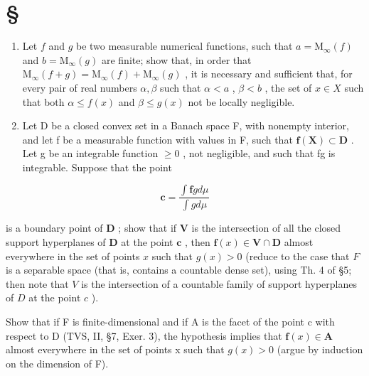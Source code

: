 \section*{\texorpdfstring{\S\CurrentExerciseGroup}{Section \CurrentExerciseGroup}}
{}

\begin{enumerate}
\def\labelenumi{\arabic{enumi})}
\item
  Let \(f\) and \(g\) be two measurable numerical functions, such that \(a = \mathrm{M}_{\infty}(f)\) and \(b = \mathrm{M}_{\infty}(g)\) are finite; show that, in order that \(\mathrm{M}_{\infty}(f + g) = \mathrm{M}_{\infty}(f) + \mathrm{M}_{\infty}(g)\) , it is necessary and sufficient that, for every pair of real numbers \(\alpha, \beta\) such that \(\alpha < a\) , \(\beta < b\) , the set of \(x \in X\) such that both \(\alpha \leqslant f(x)\) and \(\beta \leqslant g(x)\) not be locally negligible.
\item
  Let D be a closed convex set in a Banach space F, with nonempty interior, and let f be a measurable function with values in F, such that \(\mathbf{f}(\mathbf{X}) \subset \mathbf{D}\) . Let g be an integrable function \(\geqslant 0\) , not negligible, and such that fg is integrable. Suppose that the point
\end{enumerate}

\[
\mathbf {c} = \frac {\int \mathbf {f} g d \mu}{\int g d \mu}
\]

is a boundary point of \(\mathbf{D}\) ; show that if \(\mathbf{V}\) is the intersection of all the closed support hyperplanes of \(\mathbf{D}\) at the point \(\mathbf{c}\) , then \(\mathbf{f}(x) \in \mathbf{V} \cap \mathbf{D}\) almost everywhere in the set of points \(x\) such that \(g(x) > 0\) (reduce to the case that \(F\) is a separable space (that is, contains a countable dense set), using Th. 4 of §5; then note that \(V\) is the intersection of a countable family of support hyperplanes of \(D\) at the point \(c\) ).

Show that if F is finite-dimensional and if A is the facet of the point c with respect to D (TVS, II, §7, Exer. 3), the hypothesis implies that \(\mathbf{f}(x) \in \mathbf{A}\) almost everywhere in the set of points x such that \(g(x) > 0\) (argue by induction on the dimension of F).

